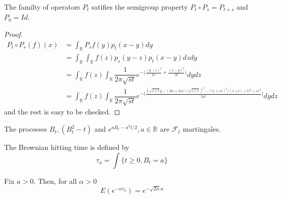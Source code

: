 \documentclass[lang=en, color=blue, ]{elegantbook}
\newcommand{\F}{\mathcal{F}}
\newcommand{\R}{\mathbb{R}}
\begin{document}
\begin{proposition}
    The familty of operators $P_t$ satifies the semigroup property $P_t\circ P_s = P_{t+s}$ and $P_0 = Id$.
\end{proposition}
\begin{proof}
    \[
    \begin{aligned}
    P_t\circ P_s(f)(x) &= \int_{\R} P_sf(y)p_t(x-y)dy \\ & = \int_{\R} \int_{\R} f(z) p_s(y-z)p_t(x-y) dzdy \\
    & = \int_{\R} f(z) \int_{\R} \dfrac{1}{2\pi \sqrt{st}} e^{-\Big(\tfrac{(y-z)^2}{2s}+\tfrac{(x-y)^2}{2t}\Big)} dydz \\
    & = \int_{\R} f(z) \int_{\R} \dfrac{1}{2\pi \sqrt{st}} e^{-\Big(\tfrac{(\sqrt{s+t}y-(2tz+2sx)/\sqrt{s+t})^2-(tz+sx)^2/(s+t)+tz^2+sx^2}{2st}\Big)} dydz
    \end{aligned}
    \]
    and the rest is easy to be checked.
\end{proof}

\begin{theorem}
    The processes $B_t, (B_t^2-t)$ and $e^{aB_t-a^2t/2}, a\in\R$ are $\F_t$ martingales.
\end{theorem}

\begin{definition}
    The Brownian hitting time is defined by
    \[\tau_a = \int\{t\geq 0, B_t = a\}\]
\end{definition}

\begin{proposition}
    Fix $a>0$. Then, for all $\alpha > 0$
    \[E(e^{-\alpha\tau_a}) = e^{-\sqrt{2\alpha}a}\]
\end{proposition}

\begin{theorem}
    
\end{theorem}
\end{document}
